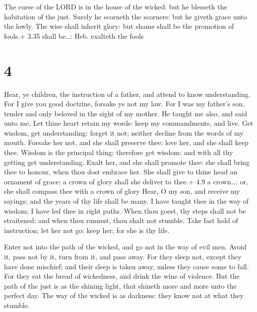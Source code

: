  The curse of the LORD is in the house of the wicked: but
he blesseth the habitation of the just.  Surely he scorneth
the scorners: but he giveth grace unto the lowly.  The wise
shall inherit glory: but shame shall be the promotion of fools.+ 3.35
shall be\ldots: Heb. exalteth the fools

\hypertarget{section-3}{%
\section{4}\label{section-3}}

 Hear, ye children, the instruction of a father, and attend
to know understanding.  For I give you good doctrine,
forsake ye not my law.  For I was my father's son, tender
and only beloved in the sight of my mother.  He taught me
also, and said unto me, Let thine heart retain my words: keep my
commandments, and live.  Get wisdom, get understanding:
forget it not; neither decline from the words of my mouth. 
Forsake her not, and she shall preserve thee: love her, and she shall
keep thee.  Wisdom is the principal thing; therefore get
wisdom: and with all thy getting get understanding.  Exalt
her, and she shall promote thee: she shall bring thee to honour, when
thou dost embrace her.  She shall give to thine head an
ornament of grace: a crown of glory shall she deliver to thee.+ 4.9 a
crown\ldots: or, she shall compass thee with a crown of glory
 Hear, O my son, and receive my sayings; and the years of
thy life shall be many.  I have taught thee in the way of
wisdom; I have led thee in right paths.  When thou goest,
thy steps shall not be straitened; and when thou runnest, thou shalt not
stumble.  Take fast hold of instruction; let her not go:
keep her; for she is thy life.

 Enter not into the path of the wicked, and go not in the
way of evil men.  Avoid it, pass not by it, turn from it,
and pass away.  For they sleep not, except they have done
mischief; and their sleep is taken away, unless they cause some to fall.
 For they eat the bread of wickedness, and drink the wine
of violence.  But the path of the just is as the shining
light, that shineth more and more unto the perfect day. 
The way of the wicked is as darkness: they know not at what they
stumble.

